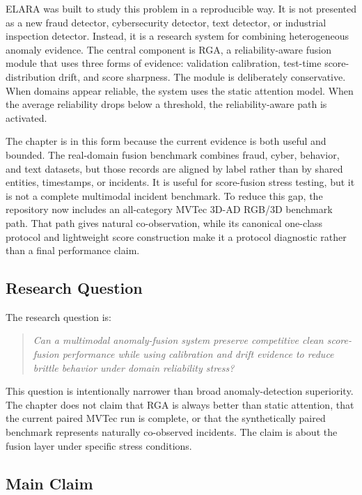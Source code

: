 \documentclass[11pt]{article}
\newcommand{\system}{ELARA}
\newcommand{\method}{RGA}
\begin{document}
\system{} was built to study this problem in a reproducible way. It is not
presented as a new fraud detector, cybersecurity detector, text detector, or
industrial inspection detector. Instead, it is a research system for combining
heterogeneous anomaly evidence. The central component is \method{}, a
reliability-aware fusion module that uses three forms of evidence: validation
calibration, test-time score-distribution drift, and score sharpness. The
module is deliberately conservative. When domains appear reliable, the system
uses the static attention model. When the average reliability drops below a
threshold, the reliability-aware path is activated.

The chapter is in this form because the current evidence is both useful and
bounded. The real-domain fusion benchmark combines fraud, cyber, behavior, and
text datasets, but those records are aligned by label rather than by shared
entities, timestamps, or incidents. It is useful for score-fusion stress
testing, but it is not a complete multimodal incident benchmark. To reduce this
gap, the repository now includes an all-category MVTec 3D-AD RGB/3D benchmark
path. That path gives natural co-observation, while its canonical one-class
protocol and lightweight score construction make it a protocol diagnostic
rather than a final performance claim.

\subsection{Research Question}

The research question is:

\begin{quote}
\emph{Can a multimodal anomaly-fusion system preserve competitive clean
score-fusion performance while using calibration and drift evidence to reduce
brittle behavior under domain reliability stress?}
\end{quote}

This question is intentionally narrower than broad anomaly-detection
superiority. The chapter does not claim that \method{} is always better than
static attention, that the current paired MVTec run is complete, or that the
synthetically paired benchmark represents naturally co-observed incidents. The claim
is about the fusion layer under specific stress conditions.

\subsection{Main Claim}
\end{document}
